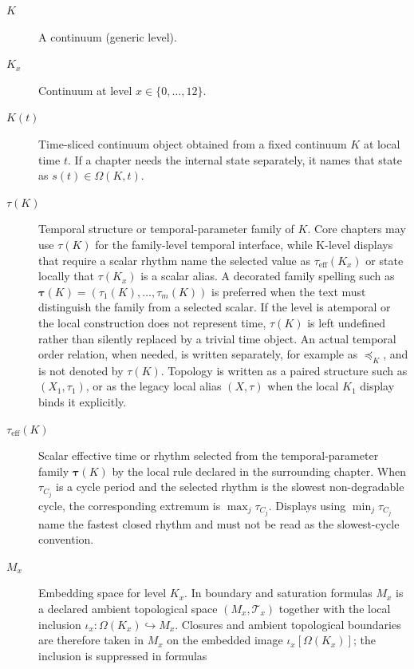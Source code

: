 \begin{description}
  \item[\(K\)] A continuum (generic level).
  \item[\(K_x\)] Continuum at level \(x\in\{0,\dots,12\}\).
  \item[\(K(t)\)] Time-sliced continuum object obtained from a fixed continuum
        \(K\) at local time \(t\). If a chapter needs the internal state
        separately, it names that state as \(s(t)\in\Omega(K,t)\).
  \item[\(\tau(K)\)] Temporal structure or temporal-parameter family of \(K\).
        Core chapters may use \(\tau(K)\) for the family-level temporal
        interface, while K-level displays that require a scalar rhythm name the
        selected value as \(\tau_{\mathrm{eff}}(K_x)\) or state locally that
        \(\tau(K_x)\) is a scalar alias. A decorated family spelling such as
        \(\boldsymbol{\tau}(K)=(\tau_1(K),\dots,\tau_m(K))\) is preferred when
        the text must distinguish the family from a selected scalar. If the
        level is atemporal or the local construction does not represent time,
        \(\tau(K)\) is left undefined rather than silently replaced by a
        trivial time object. An actual temporal order relation, when needed, is
        written separately, for example as \(\preceq_K\), and is not denoted by
        \(\tau(K)\). Topology is written as a paired structure such as
        \((X_1,\tau_1)\), or as the legacy local alias \((X,\tau)\) when the
        local \(K_1\) display binds it explicitly.
  \item[\(\tau_{\mathrm{eff}}(K)\)] Scalar effective time or rhythm selected
        from the temporal-parameter family \(\boldsymbol{\tau}(K)\) by the local rule
        declared in the surrounding chapter. When \(\tau_{C_j}\) is a cycle
        period and the selected rhythm is the slowest non-degradable cycle, the
        corresponding extremum is \(\max_j\tau_{C_j}\). Displays using
        \(\min_j\tau_{C_j}\) name the fastest closed rhythm and must not be read
        as the slowest-cycle convention.
  \item[\(M_x\)] Embedding space for level \(K_x\). In boundary and
        saturation formulas \(M_x\) is a declared ambient topological space
        \((M_x,\mathcal{T}_x)\) together with the local inclusion
        \(\iota_x:\Omega(K_x)\hookrightarrow M_x\). Closures and ambient
        topological boundaries are therefore taken in \(M_x\) on the embedded
        image \(\iota_x[\Omega(K_x)]\); the inclusion is suppressed in formulas

\end{description}
